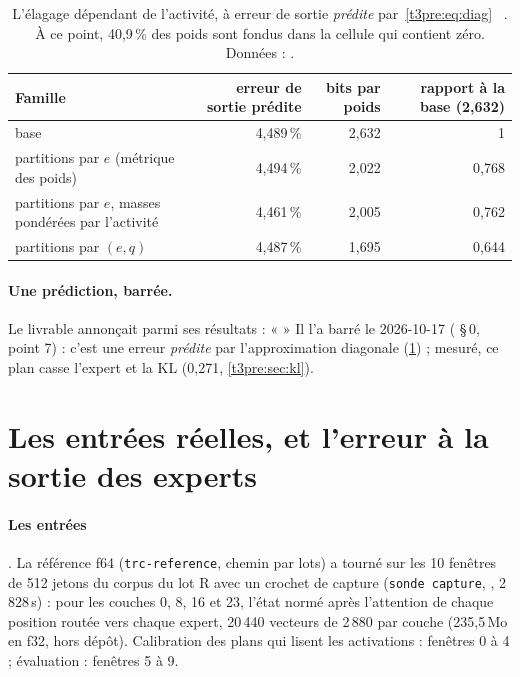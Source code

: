 \begin{table}[tbp]
\centering\footnotesize\setlength{\tabcolsep}{3pt}
\begin{tabularx}{\linewidth}{@{}>{\raggedright\arraybackslash}X r r r@{}}
\toprule
Famille & erreur de sortie prédite & bits par poids & rapport à la base (2,632) \\
\midrule
base & 4,489\,\% & 2,632 & 1 \\
partitions par $e$ (métrique des poids) & 4,494\,\% & 2,022 & 0,768 \\
partitions par $e$, masses pondérées par l'activité & 4,461\,\% & 2,005 & 0,762 \\
partitions par $(e, q)$ & 4,487\,\% & 1,695 & 0,644 \\
\bottomrule
\end{tabularx}
\caption[L'élagage dépendant de l'activité, erreur prédite]{L'élagage dépendant de l'activité, à erreur de sortie \emph{prédite} par~\eqref{t3pre:eq:diag} \mes~\calc. À ce point, 40,9\,\% des poids sont fondus dans la cellule qui contient zéro. Données : .}
\label{t3pre:tab:activite}
\end{table}

\paragraph{Une prédiction, barrée.} Le livrable annonçait parmi ses résultats : «  » Il l'a barré le 2026-10-17 ( §\,0, point 7) : c'est une erreur \emph{prédite} par l'approximation diagonale (\cref{t3pre:tab:activite}) ; mesuré, ce plan casse l'expert et la KL (0,271, \cref{t3pre:sec:kl}).

\section{Les entrées réelles, et l'erreur à la sortie des experts}\label{t3pre:sec:sortie}

\paragraph{Les entrées} \mes. La référence f64 (\texttt{trc-reference}, chemin par lots) a tourné sur les 10 fenêtres de 512 jetons du corpus du lot R avec un crochet de capture (\texttt{sonde capture}, , 2\,828\,s) : pour les couches 0, 8, 16 et 23, l'état normé après l'attention de chaque position routée vers chaque expert, 20\,440 vecteurs de 2\,880 par couche (235,5\,Mo en f32, hors dépôt). Calibration des plans qui lisent les activations : fenêtres 0 à 4 ; évaluation : fenêtres 5 à 9.

